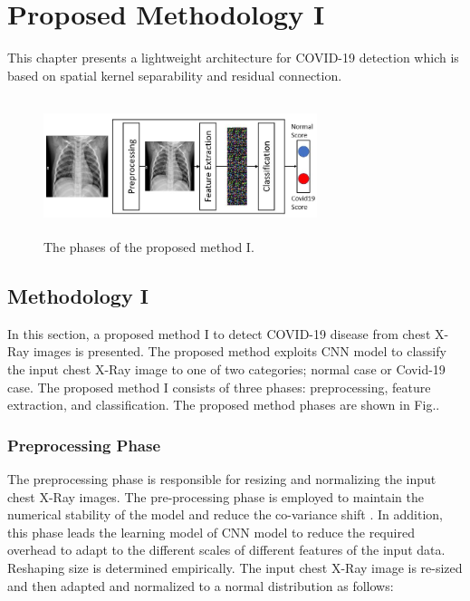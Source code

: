 
\chapter{Proposed Methodology I} %

\label{chp:proposed1} %
This chapter presents a lightweight architecture for COVID-19 detection which is based on spatial kernel separability and residual connection. 

\begin{figure}[th]
    \centering
    \includegraphics[height=40mm,width=8.0cm]{Figures/fig1.jpg}
    \caption{The phases of the proposed method I.}
    \label{fig1}
    \end{figure}

\section{Methodology I}
In this section, a  proposed  method I to detect COVID-19 disease from chest X-Ray images is presented. The proposed method exploits CNN model to classify the input chest X-Ray image to one of two categories; normal case or Covid-19 case. The proposed  method I consists of three phases: preprocessing, feature extraction, and classification. The proposed method phases are shown in Fig.. 

\subsection{Preprocessing Phase}

The preprocessing phase is responsible for resizing and normalizing the  input  chest X-Ray images. The pre-processing phase is employed to maintain the numerical stability of the model and reduce the co-variance shift \cite{lecun1989handwritten}. In addition, this phase leads the learning model of CNN model to reduce  the required overhead to adapt to the different scales of different features of the input data. Reshaping size is determined empirically. The input  chest X-Ray image is re-sized and then adapted and normalized to a normal distribution as follows:

